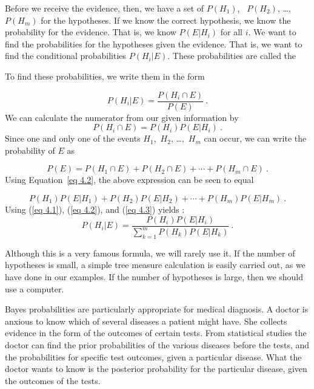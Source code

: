 Before we receive the evidence, then, we have a set of  $P(H_1)$,                \hfill\break
~$P(H_2)$, \dots,~$P(H_m)$ for the hypotheses. 
If we know the correct hypothesis, we know the probability for the evidence.  That
is, we know $P(E|H_i)$ for all $i$.  We want to find the probabilities for the
hypotheses given the evidence.  That is, we want to find the conditional
probabilities $P(H_i|E)$.  These probabilities are called the 

To find these probabilities, we write them in the form

\begin{equation}
P(H_i|E) = \frac{P(H_i \cap E)}{P(E)}\ . \label{eq 4.1}
\end{equation}
We can calculate the numerator from our given information by
\begin{equation}
P(H_i \cap E) = P(H_i)P(E|H_i)\ . \label{eq 4.2}  
\end{equation}
Since one and only one of the events $H_1$,~$H_2$, \dots,~$H_m$ can occur, we
can write the probability of $E$ as

$$
P(E) = P(H_1 \cap E)  + P(H_2 \cap E)  + \cdots + P(H_m \cap E)\ .
$$
Using Equation~\ref{eq 4.2}, the above expression can be seen to equal

\begin{equation}
   P(H_1)P(E|H_1) + P(H_2)P(E|H_2) + \cdots + P(H_m)P(E|H_m) \ .
\label{eq 4.3}                                               
\end{equation}
Using (\ref{eq 4.1}), (\ref{eq 4.2}), and (\ref{eq 4.3})
yields :
$$
P(H_i|E) = \frac{P(H_i)P(E|H_i)}{\sum_{k = 1}^m P(H_k)P(E|H_k)}\ .
$$

Although this is a very famous formula, we will rarely use it.  If the number
of hypotheses is small, a simple tree measure calculation is easily carried
out, as we have done in our examples.  If the number of hypotheses is large, then we should
use a computer.
\par
Bayes probabilities are particularly appropriate for medical diagnosis.  A
doctor is anxious to know which of several diseases a patient might have.  She
collects evidence in the form of the outcomes of certain tests.  From
statistical studies the doctor can find the prior probabilities of the various
diseases before the tests, and the probabilities for specific test outcomes,
given a particular disease.  What the doctor wants to know is the posterior
probability for the particular disease, given the outcomes of the tests.

